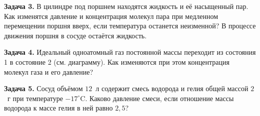 \begin{taskbasic}[code={\label{task:mkt_gas_v8_n10}}]
\textbf{Задача 3.} В цилиндре под поршнем находятся жидкость и её насыщенный пар. Как изменятся давление и концентрация молекул пара при медленном перемещении поршня вверх, если температура останется неизменной? В процессе движения поршня в сосуде остаётся жидкость.

\end{taskbasic}

\begin{taskbasic}[code={\label{task:mkt_gas_v9_n10}}]
\textbf{Задача 4.} Идеальный одноатомный газ постоянной массы переходит из состояния 1 в состояние 2 (см. диаграмму). Как изменяются при этом концентрация молекул газа и его давление?

\nopagebreak\smallskip
\begin{center}
\end{center}

\end{taskbasic}

\begin{taskbasic}[code={\label{task:mkt_gas_v10_n24}}]
\textbf{Задача 5.} Сосуд объёмом $12$~л содержит смесь водорода и гелия общей массой $2$~г при температуре $-17^{\circ}\text{C}$. Каково давление смеси, если отношение массы водорода к массе гелия в ней равно $2{,}5$?

\end{taskbasic}


